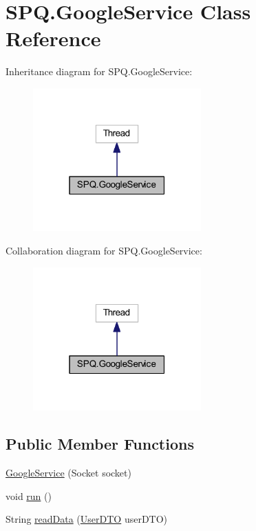 \hypertarget{class_s_p_q_1_1_google_service}{}\section{S\+P\+Q.\+Google\+Service Class Reference}
\label{class_s_p_q_1_1_google_service}


Inheritance diagram for S\+P\+Q.\+Google\+Service\+:\nopagebreak
\begin{figure}[H]
\begin{center}
\leavevmode
\includegraphics[width=183pt]{class_s_p_q_1_1_google_service__inherit__graph}
\end{center}
\end{figure}


Collaboration diagram for S\+P\+Q.\+Google\+Service\+:\nopagebreak
\begin{figure}[H]
\begin{center}
\leavevmode
\includegraphics[width=183pt]{class_s_p_q_1_1_google_service__coll__graph}
\end{center}
\end{figure}
\subsection*{Public Member Functions}
\begin{DoxyCompactItemize}
\item 
\mbox{\hyperlink{class_s_p_q_1_1_google_service_aa585d2611aa3d84e9cdbc67609207c99}{Google\+Service}} (Socket socket)
\item 
void \mbox{\hyperlink{class_s_p_q_1_1_google_service_aecd41a7e761dc392fc96e096547dc504}{run}} ()
\item 
String \mbox{\hyperlink{class_s_p_q_1_1_google_service_a94e224618cc0433776bcb49bff80067f}{read\+Data}} (\mbox{\hyperlink{class_s_p_q_1_1dto_1_1_user_d_t_o}{User\+D\+TO}} user\+D\+TO)
\end{DoxyCompactItemize}


